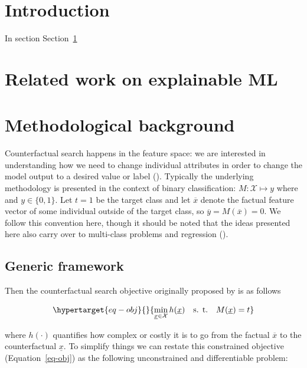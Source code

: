\documentclass[
  letterpaper,
  DIV=11,
  numbers=noendperiod]{scrartcl}
\author{}
\date{}
\begin{document}
\hypertarget{sec-intro}{%
\section{Introduction}\label{sec-intro}}

In section Section~\ref{sec-intro}

\hypertarget{related-work-on-explainable-ml}{%
\section{Related work on explainable
ML}\label{related-work-on-explainable-ml}}

\hypertarget{sec-method}{%
\section{Methodological background}\label{sec-method}}

Counterfactual search happens in the feature space: we are interested in
understanding how we need to change individual attributes in order to
change the model output to a desired value or label
(\cite{molnar2020interpretable}). Typically the underlying methodology
is presented in the context of binary classification:
\(M: \mathcal{X} \mapsto y\) where and \(y\in\{0,1\}\). Let \(t=1\) be
the target class and let \(\overline{x}\) denote the factual feature
vector of some individual outside of the target class, so
\(\overline{y}=M(\overline{x})=0\). We follow this convention here,
though it should be noted that the ideas presented here also carry over
to multi-class problems and regression (\cite{molnar2020interpretable}).

\hypertarget{generic-framework}{%
\subsection{Generic framework}\label{generic-framework}}

Then the counterfactual search objective originally proposed by
\cite{wachter2017counterfactual} is as follows

\begin{equation}\protect\hypertarget{eq-obj}{}{
\min_{\underline{x} \in \mathcal{X}} h(\underline{x}) \ \ \ \mbox{s. t.} \ \ \ M(\underline{x}) = t
}\label{eq-obj}\end{equation}

where \(h(\cdot)\) quantifies how complex or costly it is to go from the
factual \(\overline{x}\) to the counterfactual \(\underline{x}\). To
simplify things we can restate this constrained objective
(Equation~\ref{eq-obj}) as the following unconstrained and
differentiable problem:
\end{document}
